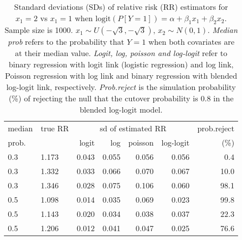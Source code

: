\documentclass[12pt,a4paper]{article}
\begin{document}
\begin{table}[H] 
\small\sf\centering 
\caption{Standard deviations (SDs) of relative risk (RR) estimators for $x_1=2$ vs $x_1=1$ when $\mbox{logit}(P[Y=1])=\alpha+\beta_1 x_1 + \beta_2 x_2$. Sample size is 1000. $x_1 \sim $$U(-\sqrt{3},-\sqrt{3})$, $x_2 \sim N(0,1)$. {\it Median prob} refers to the probability that $Y=1$ when both covariates are at their median value. {\it Logit, log, poisson and log-logit} refer to binary regression with logit link (logistic regression) and log link, Poisson regression with log link and binary regression with blended log-logit link, respectively. {\it Prob.reject} is the simulation probability (\%) of rejecting the null that the cutover probability is $0.8$ in the blended log-logit model.} 
\begin{tabular}{llrrrrr} 
\toprule 
median & true RR & \multicolumn{4}{c}{sd of estimated RR} & prob.reject \\ 
prob. & & logit & log & poisson & log-logit  & (\%) \\ \midrule 
0.3 & 1.173 & 0.043 & 0.055 & 0.056 & 0.056 &  0.4 \\  
0.3 & 1.332 & 0.033 & 0.066 & 0.070 & 0.067 & 10.0 \\  
0.3 & 1.346 & 0.028 & 0.075 & 0.106 & 0.060 & 98.1 \\  
0.5 & 1.098 & 0.014 & 0.035 & 0.069 & 0.023 & 99.8 \\  
0.5 & 1.143 & 0.020 & 0.034 & 0.038 & 0.037 & 22.3 \\  
0.5 & 1.206 & 0.012 & 0.041 & 0.047 & 0.025 & 76.6 \\  
\bottomrule 
\end{tabular} 
\end{table} 
\end{document}
